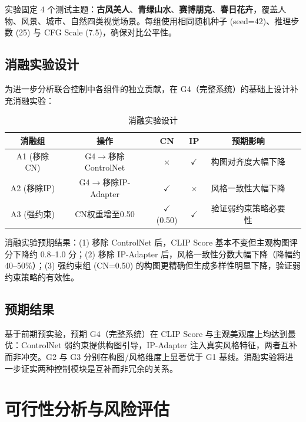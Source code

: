 \documentclass[10pt,a4paper]{article}
\begin{document}
实验固定 4 个测试主题：\textbf{古风美人}、\textbf{青绿山水}、\textbf{赛博朋克}、\textbf{春日花卉}，覆盖人物、风景、城市、自然四类视觉场景。每组使用相同随机种子 (seed=42)、推理步数 (25) 与 CFG Scale (7.5)，确保对比公平性。

\subsection{消融实验设计}

为进一步分析联合控制中各组件的独立贡献，在 G4（完整系统）的基础上设计补充消融实验：

\begin{table}[H]
\centering
\caption{消融实验设计}
\label{tab:ablation}
\begin{tabular}{@{}cccccc@{}}
\toprule
\textbf{消融组} & \textbf{操作} & \textbf{CN} & \textbf{IP} & \textbf{预期影响} \\
\midrule
A1 (移除CN)  & G4$\to$移除ControlNet & $\times$ & $\checkmark$ & 构图对齐度大幅下降 \\
A2 (移除IP)  & G4$\to$移除IP-Adapter & $\checkmark$ & $\times$ & 风格一致性大幅下降 \\
A3 (强约束)  & CN权重增至0.50    & $\checkmark$(0.50) & $\checkmark$ & 验证弱约束策略必要性 \\
\bottomrule
\end{tabular}
\end{table}

消融实验预期结果：(1) 移除 ControlNet 后，CLIP Score 基本不变但主观构图评分下降约 0.8--1.0 分；(2) 移除 IP-Adapter 后，风格一致性分数大幅下降（降幅约 40--50\%）；(3) 强约束组 (CN=0.50) 的构图更精确但生成多样性明显下降，验证弱约束策略的有效性。

\subsection{预期结果}

基于前期预实验，预期 G4（完整系统）在 CLIP Score 与主观美观度上均达到最优：ControlNet 弱约束提供构图引导，IP-Adapter 注入真实风格特征，两者互补而非冲突。G2 与 G3 分别在构图/风格维度上显著优于 G1 基线。消融实验将进一步证实两种控制模块是互补而非冗余的关系。

\section{可行性分析与风险评估}
\end{document}
